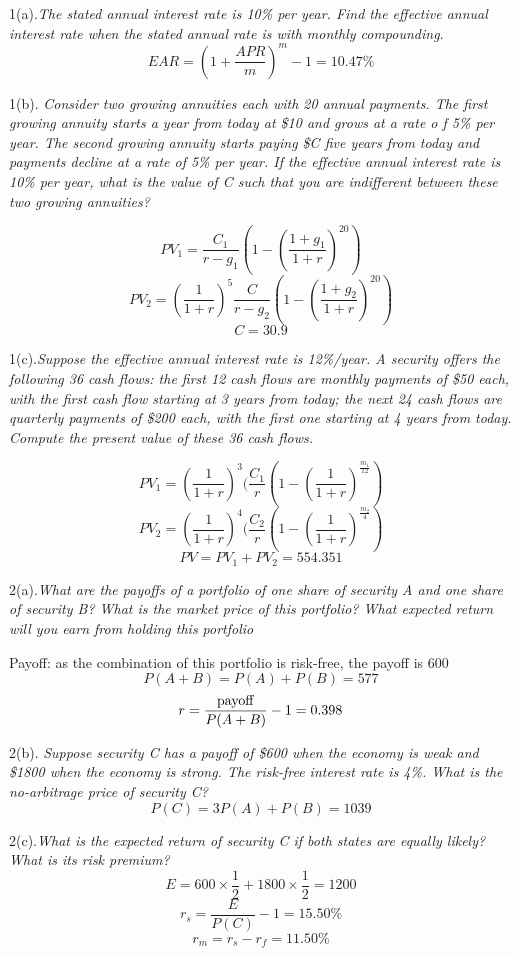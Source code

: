 \documentclass[10pt, a4paper]{article}
\begin{document}
1(a).\emph{The stated annual interest rate is 10\% per year. Find the effective annual interest rate when the stated annual rate is with monthly compounding}.
$$EAR = (1 + \frac{APR}{m})^m - 1 = 10.47\%$$

1(b). \emph{Consider two growing annuities each with 20 annual payments. The first growing annuity starts a year from today at \$10 and grows at a rate o  f 5\% per year. The second growing annuity starts paying \$C five years from today and payments decline at a rate of 5\% per year. If the effective annual interest rate is 10\% per year, what is the value of C such that you are indifferent between these two growing annuities?}

$$PV_1 = \frac{C_1}{r - g_1}(1 - (\frac{1 + g_1}{1 + r})^{20})$$
$$PV_2 = (\frac{1}{1 + r})^5\frac{C}{r - g_2}(1 - (\frac{1 + g_2}{1 + r})^{20})$$
$$C = 30.9$$

1(c).\emph{Suppose the effective annual interest rate is 12\%/year. A security offers the following 36 cash flows: the first 12 cash flows are monthly payments of 
\$50 each, with the first cash flow starting at 3 years from today; the next 24 cash flows are quarterly payments of \$200 each, with the first one starting at 4 years from today. 
Compute the present value of these 36 cash flows.}


$$PV_1 = (\frac{1}{1 + r}) ^ 3 (\frac{C_1}{r}(1 - (\frac{1}{1 + r})^{\frac{m_1}{12}})$$
$$PV_2 = (\frac{1}{1 + r}) ^ 4 (\frac{C_2}{r}(1 - (\frac{1}{1 + r})^{\frac{m_2}{4}})$$
$$PV = PV_1 + PV_2 = 554.351$$

2(a).\emph{What are the payoffs of a portfolio of one share of security A and one share of security B? What is the market price of this portfolio? What expected return will you earn from holding this portfolio}

Payoff: as the combination of this portfolio is risk-free, the payoff is 600
$$P(A + B) = P(A) + P(B) = 577$$
$$r = \frac{\rm{payoff}}{P(A + B)} - 1 = 0.398$$

2(b).\emph{ Suppose security C has a payoff of \$600 when the economy is weak and \$1800 when the economy is strong. The risk-free interest rate is 4\%. What is the no-arbitrage price of security C?}
$$P(C) = 3P(A) + P(B) = 1039$$

2(c).\emph{What is the expected return of security C if both states are equally likely? What is its risk premium?}
$$E = 600 \times \frac{1}{2} + 1800 \times \frac{1}{2} = 1200$$
$$r_s = \frac{E}{P(C)} - 1 = 15.50\%$$
$$r_m = r_s - r_f = 11.50\%$$
\end{document}
